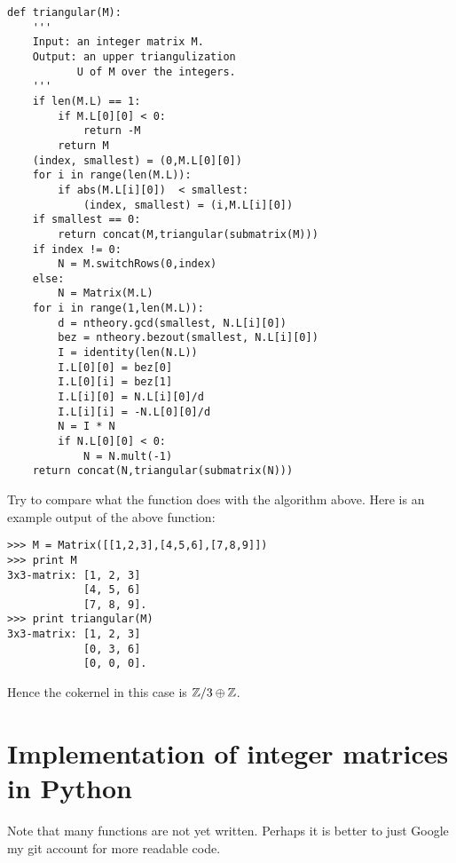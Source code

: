 \documentclass[11pt, english]{article}
\begin{document}
\begin{lstlisting}
def triangular(M):
	'''
	Input: an integer matrix M.
	Output: an upper triangulization
	       U of M over the integers.
	'''
	if len(M.L) == 1:
		if M.L[0][0] < 0:
			return -M
		return M
	(index, smallest) = (0,M.L[0][0])
	for i in range(len(M.L)):
		if abs(M.L[i][0])  < smallest:
			(index, smallest) = (i,M.L[i][0])
	if smallest == 0:
		return concat(M,triangular(submatrix(M)))
	if index != 0:
		N = M.switchRows(0,index)
	else:
		N = Matrix(M.L)
	for i in range(1,len(M.L)):
		d = ntheory.gcd(smallest, N.L[i][0])
		bez = ntheory.bezout(smallest, N.L[i][0])
		I = identity(len(N.L))
		I.L[0][0] = bez[0]
		I.L[0][i] = bez[1]
		I.L[i][0] = N.L[i][0]/d
		I.L[i][i] = -N.L[0][0]/d
		N = I * N
		if N.L[0][0] < 0:
			N = N.mult(-1)
	return concat(N,triangular(submatrix(N)))
\end{lstlisting}

Try to compare what the function does with the algorithm above. Here is an example output of the above function:

\begin{lstlisting}
>>> M = Matrix([[1,2,3],[4,5,6],[7,8,9]])
>>> print M
3x3-matrix: [1, 2, 3]
            [4, 5, 6]
            [7, 8, 9].
>>> print triangular(M)
3x3-matrix: [1, 2, 3]
            [0, 3, 6]
            [0, 0, 0].
\end{lstlisting}

Hence the cokernel in this case is $\mathbb{Z}/3 \oplus \mathbb{Z}$.

\appendix
\section{Implementation of integer matrices in Python}
\label{app:impl}

Note that many functions are not yet written. Perhaps it is better to just Google my git account for more readable code.
\end{document}
